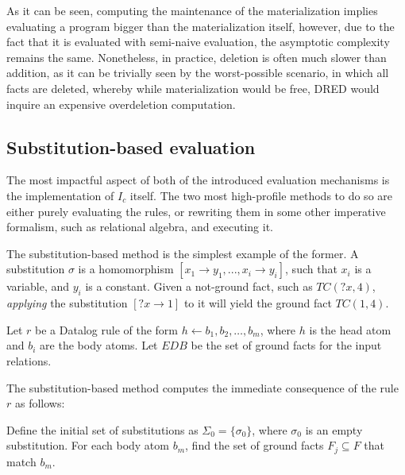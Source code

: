 \documentclass[sigconf,screen,review=false,natbib]{acmart}
\theoremstyle{definition}
\begin{document}
As it can be seen, computing the maintenance of the materialization implies evaluating a program bigger than the
materialization itself, however, due to the fact that it is evaluated with semi-naive evaluation, the asymptotic
complexity remains the same. Nonetheless, in practice, deletion is often much slower than addition, as it can be
trivially seen by the worst-possible scenario, in which all facts are deleted, whereby while materialization would
be free, DRED would inquire an expensive overdeletion computation.

\subsection{Substitution-based evaluation}
The most impactful aspect of both of the introduced evaluation mechanisms is the implementation
of $I_c$ itself. The two most high-profile methods to do so are either purely evaluating the rules, or
rewriting them in some other imperative formalism, such as relational algebra, and executing it.

The substitution-based\cite{datalog} method is the simplest example of the former. A substitution $\sigma$ is
a homomorphism $[x_1 \rightarrow y_1, ..., x_i \rightarrow y_i]$, such that $x_i$ is a variable, and $y_i$ is
a constant. Given a not-ground fact, such as $TC(?x, 4)$, \textit{applying} the substitution $[?x \rightarrow 1]$ to
it will yield the ground fact $TC(1, 4)$.

Let $r$ be a Datalog rule of the form $h \leftarrow b_1, b_2, \ldots, b_m$, where $h$ is the head atom and $b_i$ are
the body atoms. Let $EDB$ be the set of ground facts for the input relations.

The substitution-based method computes the immediate consequence of the rule $r$ as follows:

Define the initial set of substitutions as $\Sigma_0 = \{ \sigma_0 \}$, where $\sigma_0$ is an empty substitution. For
each body atom $b_m$, find the set of ground facts $F_j \subseteq F$ that match $b_m$.
\end{document}
